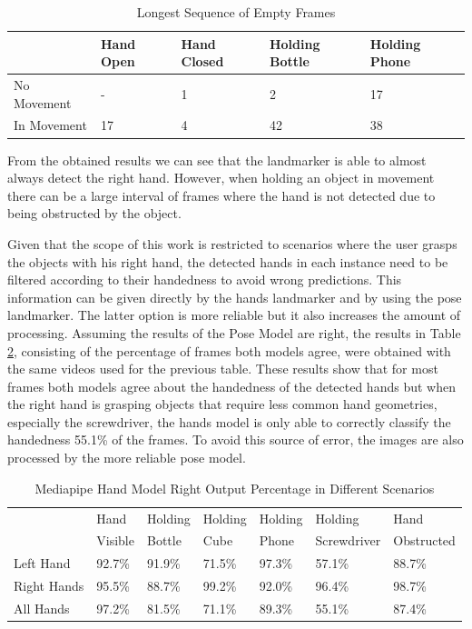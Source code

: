 \begin{table}[H]
    \centering
    \caption{Longest Sequence of Empty Frames}
    \label{table:mediapipe_metrics4}
    \begin{tabular}{|l|l|l|l|l|}
        \hline
        & Hand Open & Hand Closed & Holding Bottle & Holding Phone \\
        \hline
        No Movement & - & 1 & 2 & 17 \\
        \hline
        In Movement & 17 & 4 & 42 & 38 \\
        \hline
    \end{tabular}
\end{table}

From the obtained results we can see that the landmarker is able to almost always detect the right hand. However, when holding an object in movement there can be a large interval of frames where the hand is not detected due to being obstructed by the object. 

Given that the scope of this work is restricted to scenarios where the user grasps the objects with his right hand, the detected hands in each instance need to be filtered according to their handedness to avoid wrong predictions. This information can be given directly by the hands landmarker and by using the pose landmarker. The latter option is more reliable but it also increases the amount of processing. Assuming the results of the Pose Model are right, the results in Table \ref{table:mediapipe_metrics2}, consisting of the percentage of frames both models agree, were obtained with the same videos used for the previous table. These results show that for most frames both models agree about the handedness of the detected hands but when the right hand is grasping objects that require less common hand geometries, especially the screwdriver, the hands model is only able to correctly classify the handedness 55.1\% of the frames. To avoid this source of error, the images are also processed by the more reliable pose model.

\begin{table}[H]
    \centering
    \caption{Mediapipe Hand Model Right Output Percentage in Different Scenarios}
    \label{table:mediapipe_metrics2}
    \begin{tabular}{|l|l|l|l|l|l|l|}
        \hline
        & Hand\multirow{2}{*}{} & Holding\multirow{2}{*}{} & Holding\multirow{2}{*}{} & Holding\multirow{2}{*}{} & Holding\multirow{2}{*}{} & Hand\multirow{2}{*}{} \\
        & Visible & Bottle & Cube & Phone & Screwdriver & Obstructed \\
        \hline
        Left Hand & 92.7\% & 91.9\% & 71.5\% & 97.3\% & 57.1\% & 88.7\% \\
        \hline
        Right Hands & 95.5\% & 88.7\% & 99.2\% & 92.0\% & 96.4\% & 98.7\% \\
        \hline
        All Hands & 97.2\% & 81.5\% & 71.1\% & 89.3\% & 55.1\% & 87.4\% \\
        \hline
    \end{tabular}
\end{table}

